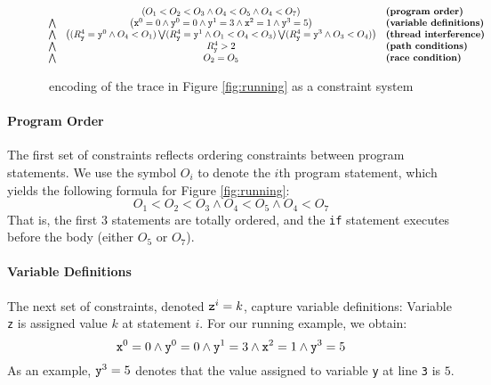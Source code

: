 \begin{figure*}
	\begin{center}
$$
	\begin{array}{rcl}
	& \left( O_1 < O_2 < O_3 \wedge O_4 < O_5 \wedge O_4 < O_7 \right) & \textbf{(program order)} \\
\bigwedge & \left( {\tt x}^0 = 0 \wedge {\tt y}^0 = 0 \wedge {\tt y}^1 = 3 \wedge 
	{\tt x}^2 = 1 \wedge {\tt y}^3 = 5 \right) & \textbf{(variable definitions)} \\
\bigwedge & \left(		(R_{\tt y}^4={\tt y}^0 \wedge O_4 < O_1) \bigvee	
(R_{\tt y}^4={\tt y}^1 \wedge O_1 < O_4 < O_3) \bigvee
(R_{\tt y}^4={\tt y}^3 \wedge O_3 < O_4)
		\right) & \textbf{(thread interference)} \\
\bigwedge & R_{\tt y}^4 > 2 & \textbf{(path conditions)} \\
\bigwedge & O_2 = O_5 & \textbf{(race condition)}
	\end{array} 
$$
\end{center}
\caption{\label{fig:encoding}\tool\ encoding of the trace in Figure \ref{fig:running} as a constraint system}
\end{figure*}

\paragraph{Program Order} The first set of constraints reflects ordering constraints between program statements. We use the symbol $O_i$ to denote the $i$th program statement, which yields the following formula for Figure \ref{fig:running}:
$$
	O_1 < O_2 < O_3 \wedge O_4 < O_5 \wedge O_4 < O_7
$$
That is, the first 3 statements are totally ordered, and the {\tt if} statement executes before the body (either $O_5$ or $O_7$).

\paragraph{Variable Definitions} The next set of constraints, denoted ${\tt z}^i=k$, capture variable definitions: Variable {\tt z} is assigned value $k$ at statement $i$. For our running example, we obtain:
$$
	{\tt x}^0 = 0 \wedge {\tt y}^0 = 0 \wedge {\tt y}^1 = 3 \wedge 
			{\tt x}^2 = 1 \wedge {\tt y}^3 = 5
$$
As an example, ${\tt y}^3 = 5$ denotes that the value assigned to variable {\tt y} 
at line {\tt 3} is $5$.

